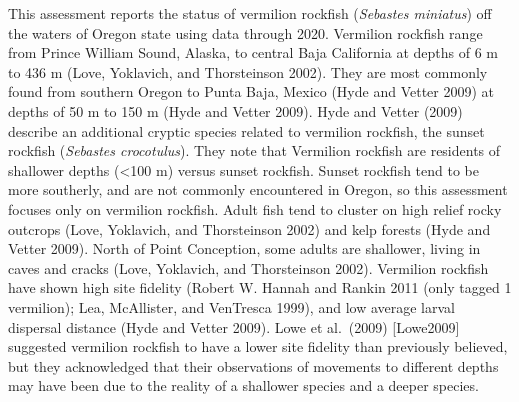 \documentclass[11pt,
  english,
  a4paper,
]{article}
\begin{document}
This assessment reports the status of vermilion rockfish (\emph{Sebastes miniatus}) off the waters of Oregon state using data through 2020. Vermilion rockfish range from Prince William Sound, Alaska, to central Baja California at depths of 6 m to 436 m {(Love, Yoklavich, and Thorsteinson 2002)\leavevmode\tagmcend\tagstructend}. They are most commonly found from southern Oregon to Punta Baja, Mexico {(Hyde and Vetter 2009)\leavevmode\tagmcend\tagstructend} at depths of 50 m to 150 m {(Hyde and Vetter 2009)\leavevmode\tagmcend\tagstructend}. Hyde and Vetter {(2009)\leavevmode\tagmcend\tagstructend} describe an additional cryptic species related to vermilion rockfish, the sunset rockfish (\emph{Sebastes crocotulus}). They note that Vermilion rockfish are residents of shallower depths (\textless100 m) versus sunset rockfish. Sunset rockfish tend to be more southerly, and are not commonly encountered in Oregon, so this assessment focuses only on vermilion rockfish. Adult fish tend to cluster on high relief rocky outcrops {(Love, Yoklavich, and Thorsteinson 2002)\leavevmode\tagmcend\tagstructend} and kelp forests {(Hyde and Vetter 2009)\leavevmode\tagmcend\tagstructend}. North of Point Conception, some adults are shallower, living in caves and cracks {(Love, Yoklavich, and Thorsteinson 2002)\leavevmode\tagmcend\tagstructend}. Vermilion rockfish have shown high site fidelity {(Robert W. Hannah and Rankin 2011 (only tagged 1 vermilion); Lea, McAllister, and VenTresca 1999)\leavevmode\tagmcend\tagstructend}, and low average larval dispersal distance {(Hyde and Vetter 2009)\leavevmode\tagmcend\tagstructend}. Lowe et al.~(2009) {[}Lowe2009{]} suggested vermilion rockfish to have a lower site fidelity than previously believed, but they acknowledged that their observations of movements to different depths may have been due to the reality of a shallower species and a deeper species.

\leavevmode\tagmcend\tagstructend\par

\end{document}
